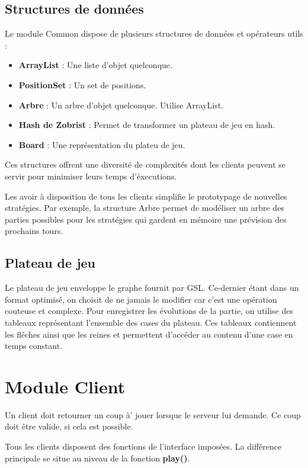 \documentclass{article}
\begin{document}
\subsection{Structures de donn\'ees}
Le module Common dispose de plusieurs structures de donn\'ees et op\'erateurs utils :
\begin{itemize}
    \item \textbf{ArrayList} : Une liste d'objet quelconque.
    \item \textbf{PositionSet} : Un set de positions.
    \item \textbf{Arbre} : Un arbre d'objet quelconque. Utilise ArrayList.
    \item \textbf{Hash de Zobrist} : Permet de transformer un plateau de jeu en hash.
    \item \textbf{Board} : Une repr\'esentation du plateu de jeu.
\end{itemize}

Ces structures offrent une diversit\'e de complexit\'es dont les clients 
peuvent se servir pour minimiser leurs temps d'\'executions.

Les avoir \`a disposition de tous les clients simplifie le prototypage de nouvelles strat\'egies.
Par exemple, la structure Arbre permet de mod\'eliser un arbre des parties possibles pour les 
strat\'egies qui gardent en m\'emoire une pr\'evision des prochains tours.

\subsection{Plateau de jeu}
Le plateau de jeu enveloppe le graphe fournit par GSL.
Ce-dernier \'etant dans un format optimis\'e, on choisit de ne jamais 
le modifier car c'est une op\'eration couteuse et complexe. Pour 
enregistrer les \'evolutions de la partie, on utilise des 
tableaux repr\'esentant l'ensemble des cases du plateau.
Ces tableaux contiennent les fl\^eches ainsi que les reines 
et permettent d'acc\'eder au contenu d'une case en temps constant.


\section{Module Client}
Un client doit retourner un coup \`a' jouer lorsque le serveur lui demande.
Ce coup doit \^etre valide, si cela est possible.

Tous les clients disposent des fonctions de l'interface impos\'ees.
La diff\'erence principale se situe au niveau de la fonction \textbf{play()}.
\end{document}
